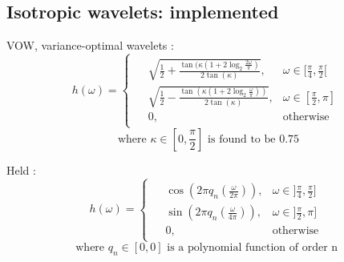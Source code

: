 \documentclass{InsightArticle}
\begin{document}
\subsection{Isotropic wavelets: implemented}
VOW, variance-optimal wavelets \cite{pad_vow:_2014} :
\begin{equation}
\label{VOW}
  h(\omega) =
    \begin{cases}
    \begin{aligned}
      &\sqrt{\frac{1}{2} + \frac{\tan(\kappa(1+2\log_2\frac{2\omega}{\pi})}{2\tan(\kappa)}} , &\omega \in [\frac{\pi}{4} , \frac{\pi}{2} [ \\
      &\sqrt{\frac{1}{2} - \frac{\tan(\kappa(1+2\log_2\frac{\omega}{\pi}))}{2\tan(\kappa)}} , &\omega \in [\frac{\pi}{2} , \pi ] \\
      &0, &\text{otherwise}
    \end{aligned}
    \end{cases}
\end{equation}
\begin{equation*}
  \text{where } \kappa \in [0, \frac{\pi}{2}] \text{ is found to be } 0.75
\end{equation*}

Held \cite{held_steerable_2010} :
\begin{equation}
\label{Held}
  h(\omega) =
    \begin{cases}
    \begin{aligned}
&\cos\left(2\pi q_n(\frac{\omega}{2\pi})\right) , &\omega \in ]\frac{\pi}{4} , \frac{\pi}{2} ] \\
  &\sin\left(2\pi q_n(\frac{\omega}{4\pi})\right) , &\omega \in ]\frac{\pi}{2} , \pi ] \\
      &0, &\text{otherwise}
    \end{aligned}
    \end{cases}
\end{equation}
\begin{equation*}
  \text{where } q_n \in [0,0] \text{ is a polynomial function of order n } %
\end{equation*}
%
\end{document}
